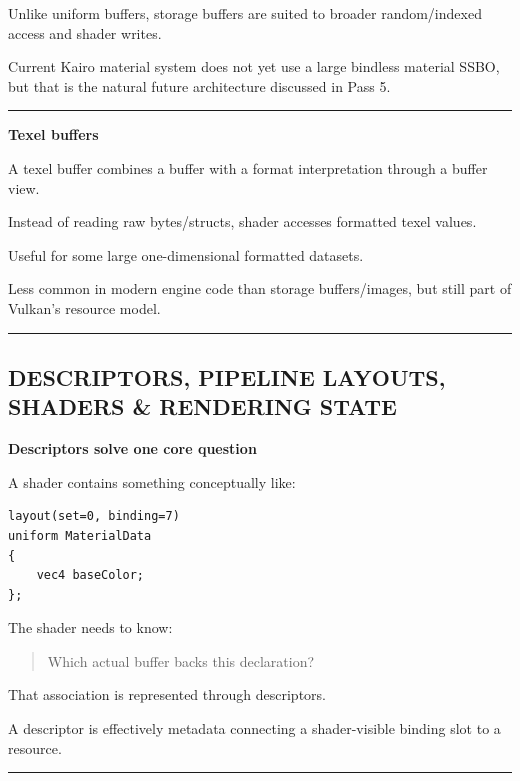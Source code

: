 Unlike uniform buffers, storage buffers are suited to broader random/indexed access and shader writes.

Current Kairo material system does not yet use a large bindless material SSBO, but that is the natural future architecture discussed in Pass 5.

\begin{center}\rule{0.5\linewidth}{0.5pt}\end{center}

\textbf{Texel buffers}

A texel buffer combines a buffer with a format interpretation through a buffer view.

Instead of reading raw bytes/structs, shader accesses formatted texel values.

Useful for some large one-dimensional formatted datasets.

Less common in modern engine code than storage buffers/images, but still part of Vulkan's resource model.

\begin{center}\rule{0.5\linewidth}{0.5pt}\end{center}

\subsection{DESCRIPTORS, PIPELINE LAYOUTS, SHADERS \& RENDERING STATE}\label{01-foundations-i-ch013-descriptors-pipeline-layouts-shaders-rendering-state}

\textbf{Descriptors solve one core question}

A shader contains something conceptually like:

\begin{verbatim}
layout(set=0, binding=7)
uniform MaterialData
{
    vec4 baseColor;
};
\end{verbatim}

The shader needs to know:

\begin{quote}
Which actual buffer backs this declaration?
\end{quote}

That association is represented through descriptors.

A descriptor is effectively metadata connecting a shader-visible binding slot to a resource.

\begin{center}\rule{0.5\linewidth}{0.5pt}\end{center}

